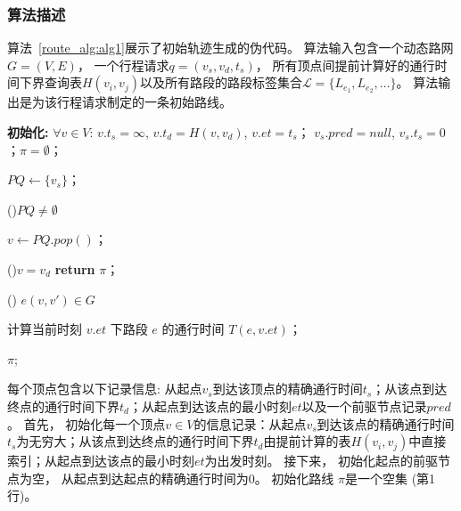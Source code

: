 \subsubsection*{算法描述}
算法~\ref{route_alg:alg1}展示了初始轨迹生成的伪代码。 算法输入包含一个动态路网$G=(V,E)$， 一个行程请求$q=(v_s,v_d,t_s)$， 所有顶点间提前计算好的通行时间下界查询表$H(v_i,v_j)$以及所有路段的路段标签集合$\mathcal{L}=\{L_{e_1}, L_{e_2}, \ldots\}$。 算法输出是为该行程请求制定的一条初始路线。
\begin{algorithm}[!ht]
    \caption{初始轨迹生成}
    \label{route_alg:alg1}

    \textbf{初始化:}
    $\forall v\in V$: $v.t_s=\infty$, $v.t_d=H(v,v_d)$, $v.et=t_s$；\newline
    $v_s.pred=null$, $v_s.t_s=0$；$\pi=\emptyset$；

    $PQ \leftarrow \{v_s\}$；

    \While(){$PQ \neq \emptyset$}{
        $v \leftarrow PQ.pop()$；

        \If(){$v = v_d$}{
            \textbf{return} $\pi$；
        }

        \For(){ $e(v,v') \in G$}{
            计算当前时刻 $v.et$ 下路段 $e$ 的通行时间 $T(e,v.et)$；

        }
    }
    \Return $\pi$;
\end{algorithm}




每个顶点包含以下记录信息: 从起点$v_s$到达该顶点的精确通行时间$t_s$；从该点到达终点的通行时间下界$t_d$；从起点到达该点的最小时刻$et$以及一个前驱节点记录$pred$。 首先， 初始化每一个顶点$v\in V$的信息记录：从起点$v_s$到达该点的精确通行时间$t_s$为无穷大；从该点到达终点的通行时间下界$t_d$由提前计算的表$H(v_i,v_j)$中直接索引；从起点到达该点的最小时刻$et$为出发时刻。 接下来， 初始化起点的前驱节点为空， 从起点到达起点的精确通行时间为0。 初始化路线 $\pi$是一个空集 (第1行)。


